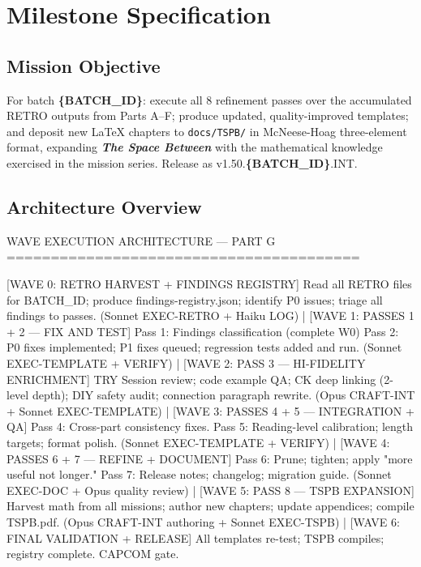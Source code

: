 \documentclass[11pt,letterpaper]{article}
\newcommand{\stageheader}[2]{%
  \noindent\colorbox{#2}{\makebox[\textwidth][l]{%
    \textcolor{white}{\bfseries\sffamily\hspace{6pt}#1\hspace{6pt}}}}%
  \vspace{0.5em}\par%
}
\newcommand{\param}[1]{\textcolor{paramred}{\textbf{\{#1\}}}}
\newcommand{\tspb}{\textbf{\textit{The Space Between}}}
\begin{document}
\newpage

\stageheader{STAGE 3 --- MISSION PACKAGE}{tertiary}

\section{Milestone Specification}

\subsection{Mission Objective}

For batch \param{BATCH\_ID}: execute all 8 refinement passes over the accumulated RETRO outputs from Parts A--F; produce updated, quality-improved templates; and deposit new LaTeX chapters to \texttt{docs/TSPB/} in McNeese-Hoag three-element format, expanding \tspb{} with the mathematical knowledge exercised in the mission series. Release as v1.50.\param{BATCH\_ID}.INT.

\subsection{Architecture Overview}

\begin{asciibox}
WAVE EXECUTION ARCHITECTURE --- PART G
========================================

  [WAVE 0: RETRO HARVEST + FINDINGS REGISTRY]
  Read all RETRO files for {BATCH\_ID};
  produce findings-registry.json;
  identify P0 issues; triage all findings to passes.
  (Sonnet EXEC-RETRO + Haiku LOG)
         |
  [WAVE 1: PASSES 1 + 2 --- FIX AND TEST]
  Pass 1: Findings classification (complete W0)
  Pass 2: P0 fixes implemented; P1 fixes queued;
          regression tests added and run.
  (Sonnet EXEC-TEMPLATE + VERIFY)
         |
  [WAVE 2: PASS 3 --- HI-FIDELITY ENRICHMENT]
  TRY Session review; code example QA;
  CK deep linking (2-level depth);
  DIY safety audit; connection paragraph rewrite.
  (Opus CRAFT-INT + Sonnet EXEC-TEMPLATE)
         |
  [WAVE 3: PASSES 4 + 5 --- INTEGRATION + QA]
  Pass 4: Cross-part consistency fixes.
  Pass 5: Reading-level calibration;
          length targets; format polish.
  (Sonnet EXEC-TEMPLATE + VERIFY)
         |
  [WAVE 4: PASSES 6 + 7 --- REFINE + DOCUMENT]
  Pass 6: Prune; tighten; apply "more useful not longer."
  Pass 7: Release notes; changelog; migration guide.
  (Sonnet EXEC-DOC + Opus quality review)
         |
  [WAVE 5: PASS 8 --- TSPB EXPANSION]
  Harvest math from all missions; author new chapters;
  update appendices; compile TSPB.pdf.
  (Opus CRAFT-INT authoring + Sonnet EXEC-TSPB)
         |
  [WAVE 6: FINAL VALIDATION + RELEASE]
  All templates re-test; TSPB compiles; registry complete.
  CAPCOM gate.
\end{asciibox}
\end{document}

